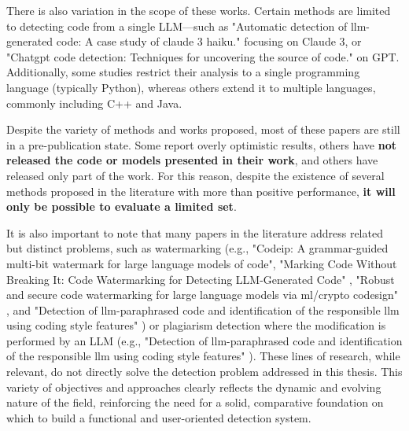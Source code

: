 There is also variation in the scope of these works. 
Certain methods are limited to detecting code from a single LLM—such as 
"Automatic detection of llm-generated code: A case study of claude 
3 haiku."\cite{anthropic2024model} focusing on Claude 3, 
or "Chatgpt code detection: Techniques for uncovering the source of code." 
\cite{oedingen2024chatgpt} on GPT. 
Additionally, some studies restrict their analysis to a single programming 
language (typically Python), whereas others extend it to multiple 
languages, commonly including C++ and Java.

Despite the variety of methods and works proposed, 
most of these papers are still in a pre-publication state. 
Some report overly optimistic results, others have \textbf{not released the 
code or models presented in their work}, and others have released only 
part of the work.
For this reason, despite the existence of several methods 
proposed in the literature with more than positive performance, 
\textbf{it will only be possible to evaluate a limited set}.

It is also important to note that many papers in the literature address 
related but distinct problems, such as watermarking 
(e.g., "Codeip: A grammar-guided multi-bit watermark for large language 
models of code"\cite{guan2024codeip}, 
"Marking Code Without Breaking It: Code Watermarking for 
Detecting LLM-Generated Code" \cite{kim2025marking}, 
"Robust and secure code watermarking for large 
language models via ml/crypto codesign" \cite{zhang2025robust}, 
and "Detection of llm-paraphrased code and identification of the 
responsible llm using coding style features" \cite{park2025detection}) 
or plagiarism detection where the modification 
is performed by an LLM (e.g., "Detection of llm-paraphrased code and 
identification of the responsible llm using coding style features" 
\cite{park2025detection}). These lines of 
research, while relevant, do not directly solve the detection problem 
addressed in this thesis. This variety of objectives and approaches 
clearly reflects the dynamic and evolving nature of the field, reinforcing 
the need for a solid, comparative foundation on which to build a functional 
and user-oriented detection system.